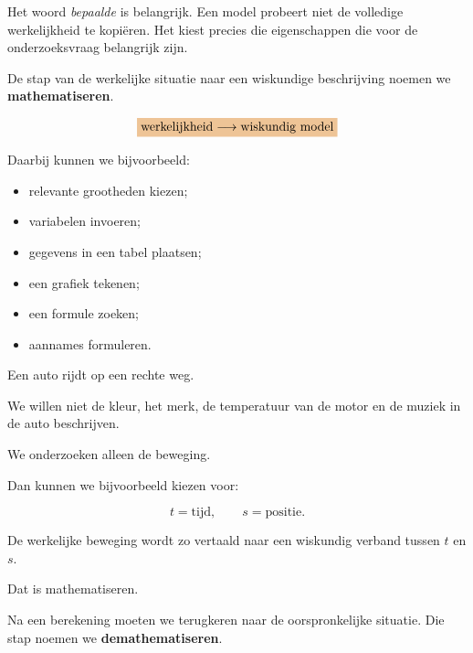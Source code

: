 \documentclass{ximera}
\begin{document}
Het woord \emph{bepaalde} is belangrijk. Een model probeert niet de volledige werkelijkheid te kopiëren. Het kiest precies die eigenschappen die voor de onderzoeksvraag belangrijk zijn.




De stap van de werkelijke situatie naar een wiskundige beschrijving
noemen we \textbf{mathematiseren}.

\[
\important{
\text{werkelijkheid}
\longrightarrow
\text{wiskundig model}
}
\]

Daarbij kunnen we bijvoorbeeld:

\begin{itemize}
  \item relevante grootheden kiezen;
  \item variabelen invoeren;
  \item gegevens in een tabel plaatsen;
  \item een grafiek tekenen;
  \item een formule zoeken;
  \item aannames formuleren.
\end{itemize}


\begin{voorbeeld}

Een auto rijdt op een rechte weg.

We willen niet de kleur, het merk, de temperatuur van de motor en de
muziek in de auto beschrijven.

We onderzoeken alleen de beweging.

Dan kunnen we bijvoorbeeld kiezen voor:

\[
t=\text{tijd},
\qquad
s=\text{positie}.
\]

De werkelijke beweging wordt zo vertaald naar een wiskundig verband
tussen $t$ en $s$.

Dat is mathematiseren.

\end{voorbeeld}




Na een berekening moeten we terugkeren naar de oorspronkelijke
situatie. Die stap noemen we \textbf{demathematiseren}.
\end{document}
